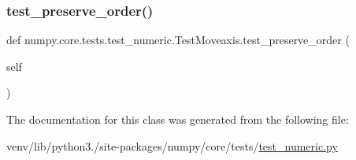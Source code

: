 \subsubsection{\texorpdfstring{test\+\_\+preserve\+\_\+order()}{test\_preserve\_order()}}
{\footnotesize\ttfamily def numpy.\+core.\+tests.\+test\+\_\+numeric.\+Test\+Moveaxis.\+test\+\_\+preserve\+\_\+order (\begin{DoxyParamCaption}\item[{}]{self }\end{DoxyParamCaption})}



The documentation for this class was generated from the following file\+:\begin{DoxyCompactItemize}
\item 
venv/lib/python3./site-\/packages/numpy/core/tests/\hyperlink{core_2tests_2test__numeric_8py}{test\+\_\+numeric.\+py}\end{DoxyCompactItemize}

